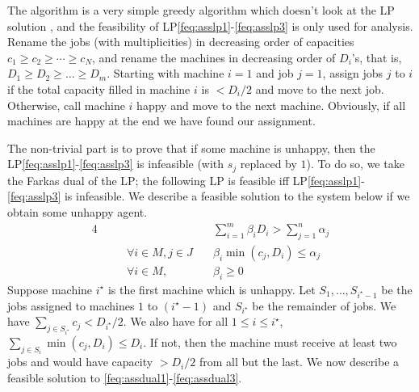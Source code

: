 %

The algorithm is a  very simple greedy algorithm which doesn't look at the LP solution , and the feasibility of LP\eqref{feq:asslp1}-\eqref{feq:asslp3} is only used for analysis.
Rename the jobs (with multiplicities) in decreasing order of capacities $c_1\geq c_2 \geq \cdots \geq c_N$, and rename  the machines in decreasing order of $D_i$'s, that is, $D_1 \geq D_2 \geq \ldots \geq D_m$.
Starting with machine $i=1$ and job $j=1$, assign jobs $j$ to $i$ if the total capacity filled in machine $i$ is $< D_i/2$ and move to the next job. Otherwise, call machine $i$ happy and move to the next machine. Obviously, if all machines are happy at the end we have found our assignment.

The non-trivial part is to  prove that if some machine is unhappy, then the LP\eqref{feq:asslp1}-\eqref{feq:asslp3} is infeasible (with $s_j$ replaced by $1$).
To do so, we take the Farkas dual of the LP; the following LP is feasible iff LP\eqref{feq:asslp1}-\eqref{feq:asslp3} is infeasible. We describe a feasible solution to the system below if we obtain some unhappy agent.
	\begin{alignat}{4}
		&&   & \quad \textstyle \sum_{i=1}^m \beta_i D_i > \sum_{j=1}^n\alpha_j \label{feq:assdual1}  \tag{F1} \\
		&& \quad \forall i\in M,j\in J & \quad \textstyle \beta_i\min(c_j,D_i) \leq \alpha_j \label{feq:assdual2} \tag{F2}  \\
		&& \quad \forall i\in M, &\quad  \beta_i \geq 0\label{feq:assdual3}\tag{F3}
	\end{alignat}
	\def\i{i^\star}
Suppose machine $\i$ is the first machine which is unhappy. Let $S_1,\ldots,S_{\i-1}$ be the jobs assigned to machines $1$ to $(\i-1)$ and $S_{i^\star}$ be the remainder of jobs.
We have $\sum_{j\in S_{\i}} c_j < D_{\i}/2$. We also have for all $1\leq i\leq \i$, $\sum_{j\in S_i} \min(c_j,D_i) \leq D_i$. If not, then the machine must receive at least two jobs and would have capacity $> D_i/2$
from all but the last.
We now describe a feasible solution to \eqref{feq:assdual1}-\eqref{feq:assdual3}.

